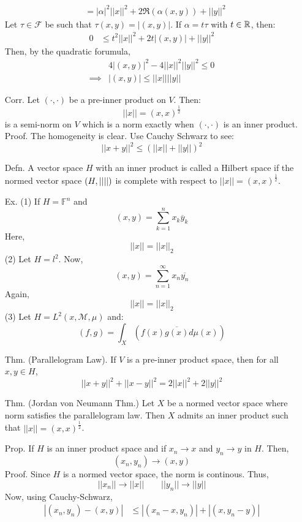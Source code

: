\documentclass[12pt]{article}
\begin{document}
\begin{itemize}
\begin{align*}
        &= |\alpha|^2 ||x||^2 + 2\Re(\alpha(x,y)) + ||y||^2
    \end{align*}
    Let $\tau \in \mathcal{F}$ be such that $\tau(x, y) = |(x, y)|$. If $\alpha = t\tau$ with $t \in \mathbb R$, then:
    \begin{align*}
        0 &\leq t^2 ||x||^2 + 2t|(x,y)| + ||y||^2  
    \end{align*}
    Then, by the quadratic forumula, 
    \begin{align*}
        &4|(x, y)|^2 - 4||x||^2||y||^2 \leq 0 \\
        \implies & |(x, y)| \leq ||x||||y||
    \end{align*}
    \item[Corr.] Let $(\cdot, \cdot)$ be a pre-inner product on $V$. Then: 
    \[ ||x|| = (x, x)^{\frac12}\]
    is a semi-norm on $V$ which is a norm exactly when $(\cdot, \cdot)$ is an inner product. \\
    Proof. The homogeneity is clear. Use Cauchy Schwarz to see: 
    \[ ||x+y||^2 \leq (||x|| + ||y||)^2\]
    \item[Defn.] A vector space $H$ with an inner product is called a Hilbert space if the normed vector space $(H, \left\vert\left\vert\right\vert\right\vert)$ is complete with respect to $||x|| = (x, x)^{\frac12}$. 
    \item[Ex.] (1) If $H = \mathbb F^n$ and
    \[ (x, y) = \sum_{k=1}^n x_k \overline{y}_k\]
    Here,
    \[ ||x|| = ||x||_2\]
    (2) Let $H = l^2$. Now, 
    \[ (x, y) = \sum_{n=1}^\infty x_n\overline{y_n}\]
    Again, 
    \[ ||x|| = ||x||_2\]
    (3) Let $H = L^2(x, \mathcal M, \mu)$ and:
    \[ (f, g) = \int_X ( f(x)\overline{g(x)} d\mu(x))\]
    \item[Thm.] (Parallelogram Law). If $V$ is a pre-inner product space, then for all $x, y \in H$, 
    \[ ||x+y||^2 + ||x-y||^2 = 2||x||^2 + 2||y||^2\]
    \item[Thm.] (Jordan von Neumann Thm.) Let $X$ be a normed vector space where norm satisfies the parallelogram law. Then $X$ admits an inner product such that $||x|| = (x, x)^{\frac12}$.
    \item[Prop.] If $H$ is an inner product space and if $x_n \to x$ and $y_n \to y$ in $H$. Then, 
    \[ (x_n, y_n) \to (x, y)\]
    Proof. Since $H$ is a normed vector space, the norm is continous. Thus, 
    \[||x_n|| \to ||x|| \qquad ||y_n|| \to ||y||\]
    Now, using Cauchy-Schwarz,
    \begin{align*}
        |(x_n, y_n) - (x, y)| &\leq |(x_n-x, y_n)| + |(x, y_n - y)| \\

\end{align*}
\end{itemize}
\end{document}
